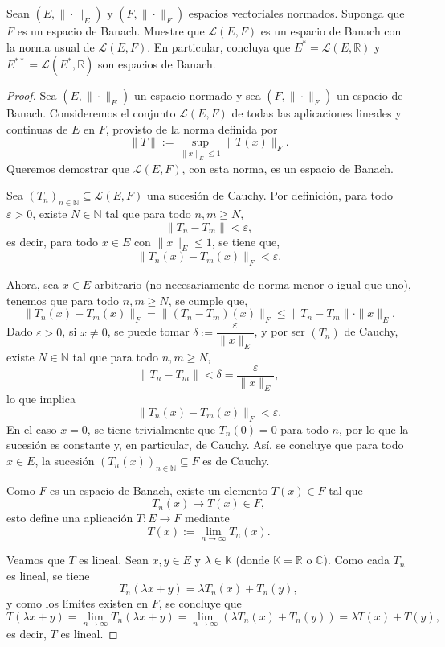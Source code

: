  Sean $(E, \| \cdot \|_E)$ y $(F, \| \cdot \|_F)$ espacios vectoriales normados. Suponga que $F$ es un espacio de Banach. Muestre que $\mathcal{L}(E, F)$ es un espacio de Banach con la norma usual de $\mathcal{L}(E, F)$. En particular, concluya que $E^* = \mathcal{L}(E, \mathbb{R})$ y $E^{**} = \mathcal{L}(E^*, \mathbb{R})$ son espacios de Banach.
\hfill

\begin{proof}
\hfill

Sea \( (E, \|\cdot\|_E) \) un espacio normado y sea \( (F, \|\cdot\|_F) \) un espacio de Banach. Consideremos el conjunto \( \mathcal{L}(E, F) \) de todas las aplicaciones lineales y continuas de \( E \) en \( F \), provisto de la norma definida por
\[
\|T\| := \sup_{\|x\|_E \leq 1} \|T(x)\|_F.
\]
Queremos demostrar que \( \mathcal{L}(E, F) \), con esta norma, es un espacio de Banach.

Sea \( (T_n)_{n \in \mathbb{N}} \subseteq \mathcal{L}(E, F) \) una sucesión de Cauchy. Por definición, para todo \( \varepsilon > 0 \), existe \( N \in \mathbb{N} \) tal que para todo \( n, m \geq N \),
\[
\|T_n - T_m\| < \varepsilon,
\]
es decir, para todo \( x \in E \) con \( \|x\|_E \leq 1 \), se tiene que,
\[
\|T_n(x) - T_m(x)\|_F < \varepsilon.
\]

Ahora, sea \( x \in E \) arbitrario (no necesariamente de norma menor o igual que uno), tenemos que para todo \( n, m \geq N \), se cumple que,
\[
\|T_n(x) - T_m(x)\|_F = \|(T_n - T_m)(x)\|_F \leq \|T_n - T_m\| \cdot \|x\|_E.
\]
Dado \( \varepsilon > 0 \), si \( x \neq 0 \), se puede tomar \( \delta := \dfrac{\varepsilon}{ \|x\|_E} \), y por ser \( (T_n) \) de Cauchy, existe \( N \in \mathbb{N} \) tal que para todo \( n, m \geq N \),
\[
\|T_n - T_m\| < \delta = \frac{\varepsilon}{\|x\|_E},
\]
lo que implica
\[
\|T_n(x) - T_m(x)\|_F < \varepsilon.
\]
En el caso \( x = 0 \), se tiene trivialmente que \( T_n(0) = 0 \) para todo \( n \), por lo que la sucesión es constante y, en particular, de Cauchy. Así, se concluye que para todo \( x \in E \), la sucesión \( (T_n(x))_{n \in \mathbb{N}} \subseteq F \) es de Cauchy.

Como \( F \) es un espacio de Banach, existe un elemento \( T(x) \in F \) tal que
\[
T_n(x) \to T(x) \in F,
\]
esto define una aplicación \( T: E \to F \) mediante
\[
T(x) := \lim_{n \to \infty} T_n(x).
\]

Veamos que \( T \) es lineal. Sean \( x, y \in E \) y \( \lambda \in \mathbb{K} \) (donde \( \mathbb{K} = \mathbb{R} \) o \( \mathbb{C} \)). Como cada \( T_n \) es lineal, se tiene
\[
T_n(\lambda x + y) = \lambda T_n(x) + T_n(y),
\]
y como los límites existen en \( F \), se concluye que
\[
T(\lambda x + y) = \lim_{n \to \infty} T_n(\lambda x + y) = \lim_{n \to \infty} (\lambda T_n(x) + T_n(y)) = \lambda T(x) + T(y),
\]
es decir, \( T \) es lineal.


\end{proof}
